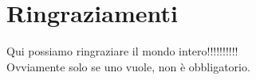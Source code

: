 \chapter*{Ringraziamenti}
\thispagestyle{empty}
Qui possiamo ringraziare il mondo intero!!!!!!!!!!\\
Ovviamente solo se uno vuole, non \`e obbligatorio.
